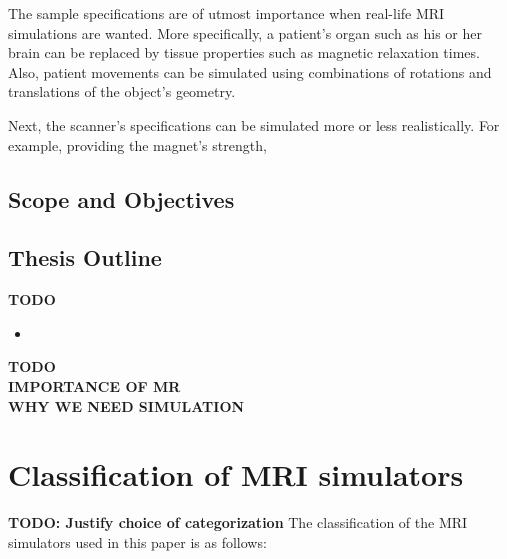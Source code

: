 \documentclass[11pt]{article}
\begin{document}
The sample specifications are of utmost importance when real-life MRI 
simulations are wanted. More specifically, a patient's organ such as 
his or her brain can be replaced by tissue properties such as magnetic 
relaxation times. Also, patient movements can be simulated using combinations of rotations and translations of the object's geometry. 

Next, the scanner's specifications can be simulated more or less 
realistically. For example, providing the magnet's strength,


\subsection{Scope and Objectives}

\subsection{Thesis Outline}

\textbf{TODO}
\begin{itemize}
	\item 
\end{itemize}


\textbf{TODO} \\
\textbf{IMPORTANCE OF MR} \\
\textbf{WHY WE NEED SIMULATION}


\section{Classification of MRI simulators}
\textbf{TODO: Justify choice of categorization}
The classification of the MRI simulators used in this paper is as 
follows:
\end{document}
